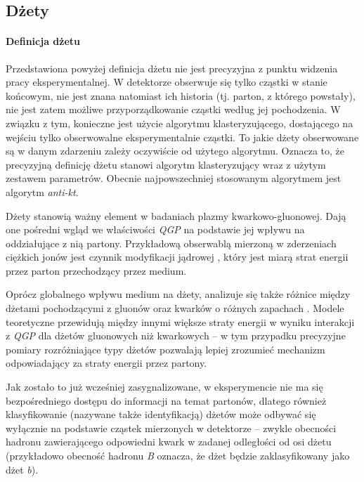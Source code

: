 \subsection{Dżety}
\label{subsec:dzet-def}

\paragraph{Definicja dżetu}
Przedstawiona powyżej definicja dżetu nie jest precyzyjna z punktu widzenia pracy eksperymentalnej. W detektorze obserwuje się tylko cząstki w stanie końcowym, nie jest znana natomiast ich historia (tj. parton, z którego powstały), nie jest zatem możliwe przyporządkowanie cząstki według jej pochodzenia. W związku z tym, konieczne jest użycie algorytmu klasteryzującego, dostającego na wejściu tylko obserwowalne eksperymentalnie cząstki. 
To jakie dżety obserwowane są w danym zdarzeniu zależy oczywiście od użytego algorytmu. Oznacza to, że precyzyjną definicję dżetu stanowi algorytm klasteryzujący wraz z użytym zestawem parametrów. Obecnie najpowszechniej stosowanym algorytmem jest algorytm \textit{anti-kt}.

Dżety stanowią ważny element w badaniach plazmy kwarkowo-gluonowej.
Dają one pośredni wgląd we właściwości \textit{QGP} na podstawie jej wpływu na oddziałujące z nią partony. Przykładową obserwablą mierzoną w zderzeniach ciężkich jonów jest czynnik modyfikacji jądrowej , który jest miarą strat energii przez parton przechodzący przez medium.

Oprócz globalnego wpływu medium na dżety, analizuje się także różnice między dżetami pochodzącymi z gluonów oraz kwarków o różnych zapachach . Modele teoretyczne przewidują między innymi większe straty energii w wyniku interakcji z \textit{QGP} dla dżetów gluonowych niż kwarkowych -- w tym przypadku precyzyjne pomiary rozróżniające typy dżetów pozwalają lepiej zrozumieć mechanizm odpowiadający za straty energii przez partony.

Jak zostało to już wcześniej zasygnalizowane, w eksperymencie nie ma się bezpośredniego dostępu do informacji na temat partonów, dlatego również klasyfikowanie (nazywane także identyfikacją) dżetów może odbywać się wyłącznie na podstawie cząstek mierzonych w detektorze -- zwykle obecności hadronu zawierającego odpowiedni kwark w zadanej odległości od osi dżetu (przykładowo obecność hadronu \textit{B} oznacza, że dżet będzie zaklasyfikowany jako dżet \textit{b}).




